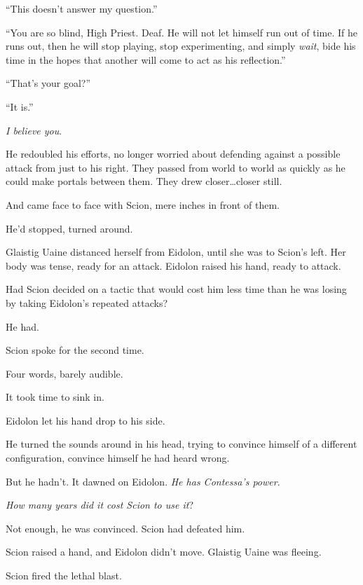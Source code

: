 ``This doesn't answer my question.''



``You are so blind, High Priest.  Deaf.  He will not let himself run out of time.  If he runs out, then he will stop playing, stop experimenting, and simply \emph{wait}, bide his time in the hopes that another will come to act as his reflection.''



``That's your goal?''



``It is.''



\emph{I believe you}.



He redoubled his efforts, no longer worried about defending against a possible attack from just to his right.  They passed from world to world as quickly as he could make portals between them.  They drew closer\ldots closer still.



And came face to face with Scion, mere inches in front of them.



He'd stopped, turned around.



Glaistig Uaine distanced herself from Eidolon, until she was to Scion's left.  Her body was tense, ready for an attack.  Eidolon raised his hand, ready to attack.



Had Scion decided on a tactic that would cost him less time than he was losing by taking Eidolon's repeated attacks?



He had.



Scion spoke for the second time.



Four words, barely audible.



It took time to sink in.



Eidolon let his hand drop to his side.



He turned the sounds around in his head, trying to convince himself of a different configuration, convince himself he had heard wrong.



But he hadn't.\emph{  }It dawned on Eidolon. \emph{ He has Contessa's power}.



\emph{How many years did it cost Scion to use it}?



Not enough, he was convinced.  Scion had defeated him.



Scion raised a hand, and Eidolon didn't move.  Glaistig Uaine was fleeing.



Scion fired the lethal blast.





